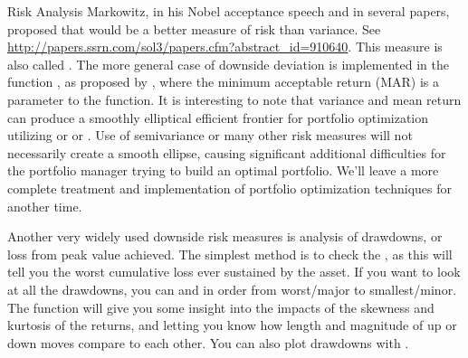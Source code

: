 \documentclass[12pt,letterpaper,english]{article}
\begin{document}
\begin{Section}{Risk Analysis}
Markowitz, in his Nobel acceptance speech and in several papers, proposed that  would be a better measure of risk than variance.  See \Cite{Zin, Markowitz, Zhao(2006)} \url{http://papers.ssrn.com/sol3/papers.cfm?abstract_id=910640}.  This measure is also called .  The more general case of downside deviation is implemented in the function , as proposed by \Cite{Sortino and Price(1994)}, where the minimum acceptable return (MAR) is a parameter to the function.  It is interesting to note that variance and mean return can produce a smoothly elliptical efficient frontier for portfolio optimization utilizing  or  or . Use of semivariance or many other risk measures will not necessarily create a smooth ellipse, causing significant additional difficulties for the portfolio manager trying to build an optimal portfolio.  We'll leave a more complete treatment and implementation of portfolio optimization techniques for another time.

Another very widely used downside risk measures is analysis of drawdowns, or loss from peak value achieved. The simplest method is to check the , as this will tell you the worst cumulative loss ever sustained by the asset.  If you want to look at all the drawdowns, you can  and  in order from worst/major to smallest/minor. The  function will give you some insight into the impacts of the skewness and kurtosis of the returns, and letting you know how length and magnitude of up or down moves compare to each other.  You can also plot drawdowns with .


\end{Section}
\end{document}
